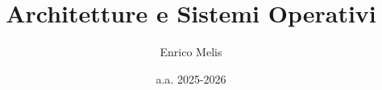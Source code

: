 \usepackage{graphicx}
\usepackage{fontspec}
\usepackage{microtype}
\setmainfont{Latin Modern Roman}
\usepackage[italian]{babel}
\usepackage{hyperref}
\usepackage{listings}
\usepackage{amsmath}
\usepackage{amssymb}
\usepackage{fancyhdr}
\usepackage{braket}
\usepackage{booktabs}
\usepackage{csquotes}
\usepackage[backend=biber,style=numeric]{biblatex}


\pagestyle{fancy}
\fancyhf{}
\fancyhead[L]{}
\fancyfoot[C]{\thepage}
\renewcommand{\headrulewidth}{0.4pt}
\renewcommand{\footrulewidth}{0.4pt}
\setlength{\headheight}{15pt}

\title{Architetture e Sistemi Operativi}
\author{Enrico Melis}
\date{a.a. 2025-2026}
